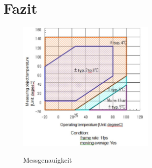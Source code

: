 \section{Fazit}


\begin{figure}[H]
	\centering
	\includegraphics[width=0.6\textwidth]
	{fig/accuracy.PNG}
	\caption[Messgenauigkeit]{Messgenauigkeit} \protect\cite{AMG8834}
	\label{fig:Temperaturbereich}
\end{figure}
